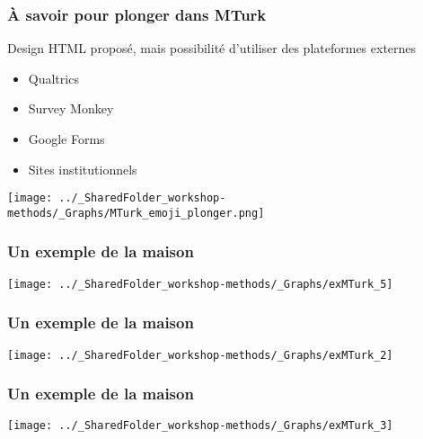 \documentclass{beamer}
\begin{document}
    \begin{frame}
    
      \frametitle{À savoir pour plonger dans MTurk} \vspace{1cm}
      
      Design HTML proposé, mais possibilité d'utiliser des plateformes externes
       \begin{itemize}
          \item{Qualtrics}
          \item{Survey Monkey}
          \item{Google Forms}
          \item{Sites institutionnels}
        \end{itemize}
   
   \begin{flushright}
     	    \texttt{[image: ../\_SharedFolder\_workshop-methods/\_Graphs/MTurk\_emoji\_plonger.png]}
    \end{flushright} 
         
    \end{frame}  
   
        

     \begin{frame}
	        \frametitle{Un exemple de la maison} \vspace{1cm}   
	        \begin{center}
	           \texttt{[image: ../\_SharedFolder\_workshop-methods/\_Graphs/exMTurk\_5]}
	        \end{center}  
	    \end{frame}
    
     \begin{frame}
	        \frametitle{Un exemple de la maison} \vspace{1cm}   
	        \begin{center}
	           \texttt{[image: ../\_SharedFolder\_workshop-methods/\_Graphs/exMTurk\_2]}
	        \end{center}  
	    \end{frame}
    
     \begin{frame}
	        \frametitle{Un exemple de la maison} \vspace{1cm}   
	        \begin{center}
	           \texttt{[image: ../\_SharedFolder\_workshop-methods/\_Graphs/exMTurk\_3]}
	        \end{center}  
	    \end{frame}
    
\end{document}
